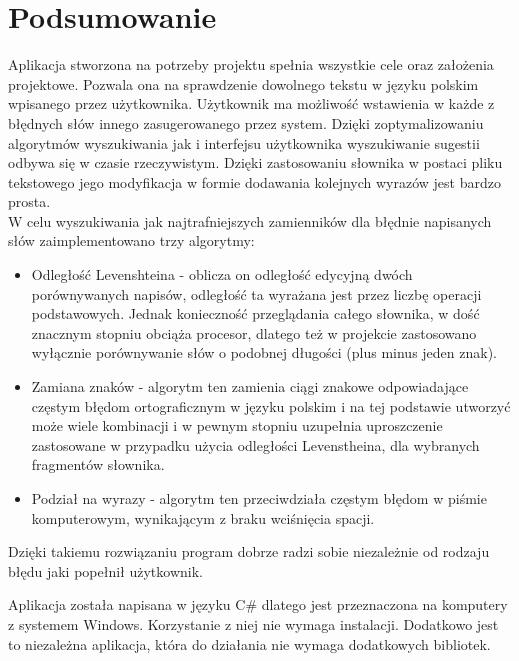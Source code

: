 \chapter{Podsumowanie}

Aplikacja stworzona na potrzeby projektu spełnia wszystkie cele oraz założenia projektowe. Pozwala ona na sprawdzenie dowolnego tekstu w języku polskim wpisanego przez użytkownika. Użytkownik ma możliwość wstawienia w każde z błędnych słów innego zasugerowanego przez system. Dzięki zoptymalizowaniu algorytmów wyszukiwania jak i interfejsu użytkownika wyszukiwanie sugestii odbywa się w czasie rzeczywistym. Dzięki zastosowaniu słownika w postaci pliku tekstowego jego modyfikacja w formie dodawania kolejnych wyrazów jest bardzo prosta. \\ 

W celu wyszukiwania jak najtrafniejszych zamienników dla błędnie napisanych słów zaimplementowano trzy algorytmy:
\begin{itemize}
	\item Odległość Levenshteina - oblicza on odległość edycyjną dwóch porównywanych napisów, odległość ta wyrażana jest przez liczbę operacji podstawowych. Jednak konieczność przeglądania całego słownika, w dość znacznym stopniu obciąża procesor, dlatego też w projekcie zastosowano wyłącznie porównywanie słów o podobnej długości (plus minus jeden znak).
	\item Zamiana znaków - algorytm ten zamienia ciągi znakowe odpowiadające częstym błędom ortograficznym w języku polskim i na tej podstawie utworzyć może wiele kombinacji i w pewnym stopniu uzupełnia uproszczenie zastosowane w przypadku użycia odległości Levenstheina, dla wybranych fragmentów słownika.
	\item Podział na wyrazy - algorytm ten przeciwdziała częstym błędom w piśmie komputerowym, wynikającym z braku wciśnięcia spacji. 
\end{itemize}

Dzięki takiemu rozwiązaniu program dobrze radzi sobie niezależnie od rodzaju błędu jaki popełnił użytkownik.

Aplikacja została napisana w języku C\# dlatego jest przeznaczona na komputery z systemem Windows. Korzystanie z niej nie wymaga instalacji. Dodatkowo jest to niezależna aplikacja, która do działania nie wymaga dodatkowych bibliotek.